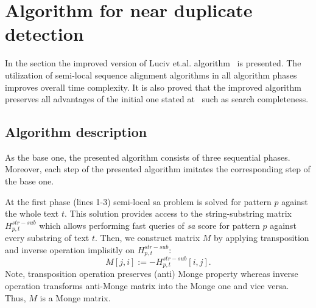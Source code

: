 \section{Algorithm for near duplicate detection}
\label{section:luciv}

In the section the improved version of Luciv et.al. algorithm~\cite{luciv2019interactive} is presented.
The utilization of semi-local sequence alignment algorithms in all algorithm phases improves overall time complexity.
It is also proved that the improved algorithm preserves all advantages of the initial one stated at~\cite{luciv2019interactive} such as search completeness.

\subsection{Algorithm description}

As the base one, the presented algorithm consists of three sequential phases.
Moreover, each step of the presented algorithm imitates the corresponding step of the base one.

At the first phase (lines 1-3) semi-local sa problem is solved for pattern $p$ against the whole text $t$.
This solution provides access to the string-substring matrix $H^{str-sub}_{p,t}$ which allows performing fast queries of \emph{sa} score for pattern $p$ against every substring of text $t$.
Then, we construct matrix $M$ by applying transposition and inverse operation implisitly on $H^{str-sub}_{p,t}$:
$$M[j,i]:= -H^{str-sub}_{p,t}[i,j].$$
Note, transposition operation preserves (anti) Monge property whereas inverse operation transforms anti-Monge matrix into the Monge one and vice versa. 
Thus, $M$ is a Monge matrix.

